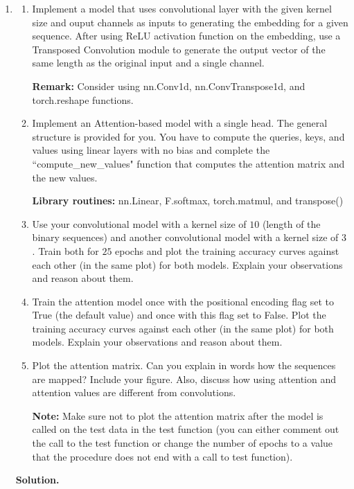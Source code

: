 \documentclass{article}
\theoremstyle{definition}
\theoremstyle{remark}
\newenvironment{Q}
{%
\clearpage
\item
}
{%
\phantom{s}%
\bigskip%
\noindent\textbf{Solution.}
}
\begin{document}
\begin{enumerate}[font={\Large\bfseries},left=0pt]
\begin{Q}
    \begin{enumerate}
        \item Implement a model that uses convolutional layer with the given kernel size and ouput channels as inputs to generating the embedding for a given sequence. After using ReLU activation function on the embedding, use a Transposed Convolution module to generate the output vector of the same length as the original input and a single channel. 
        
        \textbf{Remark:} Consider using nn.Conv1d, nn.ConvTranspose1d, and torch.reshape functions.

        \item Implement an Attention-based model with a single head. The general structure is provided for you. You have to compute the queries, keys, and values using linear layers with no bias and complete the ``compute\_new\_values" function that computes the attention matrix and the new values.
        
    \textbf{Library routines:}  nn.Linear, F.softmax, torch.matmul, and transpose()

        \item Use your convolutional model with a kernel size of $10$ (length of the binary sequences) and another convolutional model with a kernel size of $3$. Train both for $25$ epochs and plot the training accuracy curves against each other (in the same plot) for both models. Explain your observations and reason about them.
    

        \item Train the attention model once with the positional encoding flag set to True (the default value) and once with this flag set to False. Plot the training accuracy curves against each other (in the same plot) for both models. Explain your observations and reason about them.

        \item Plot the attention matrix. Can you explain in words how the sequences are mapped? Include your figure. Also, discuss how using attention and attention values are different from convolutions. 

        \textbf{Note:} Make sure not to plot the attention matrix after the model is called on the test data in the test function (you can either comment out the call to the test function or change the number of epochs to a value that the procedure does not end with a call to test function).
        
    \end{enumerate}
\end{Q}


\end{enumerate}
\end{document}
